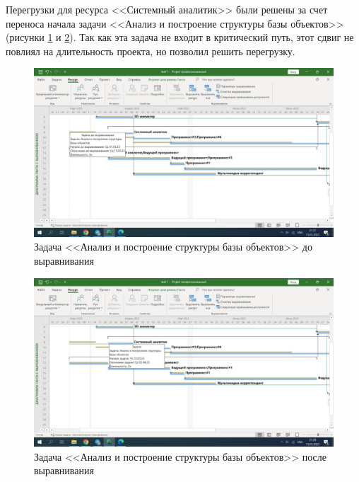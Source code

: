 Перегрузки для ресурса <<Системный аналитик>> были решены за счет переноса начала задачи <<Анализ и построение структуры базы объектов>> (рисунки \ref{img:task1-analysis-before} и \ref{img:task1-analysis-after}). Так как эта задача не входит в критический путь, этот сдвиг не повлиял на длительность проекта, но позволил решить перегрузку.

\begin{figure}[H]
	\begin{center}
		\includegraphics[scale=0.3]{inc/img/task1-analysis-before.jpg}
	\end{center}
	\captionsetup{justification=centering}
	\caption{Задача <<Анализ и построение структуры базы объектов>> до выравнивания}
	\label{img:task1-analysis-before}
\end{figure}

\begin{figure}[H]
	\begin{center}
		\includegraphics[scale=0.3]{inc/img/task1-analysis-after.jpg}
	\end{center}
	\captionsetup{justification=centering}
	\caption{Задача <<Анализ и построение структуры базы объектов>> после выравнивания}
	\label{img:task1-analysis-after}
\end{figure}

